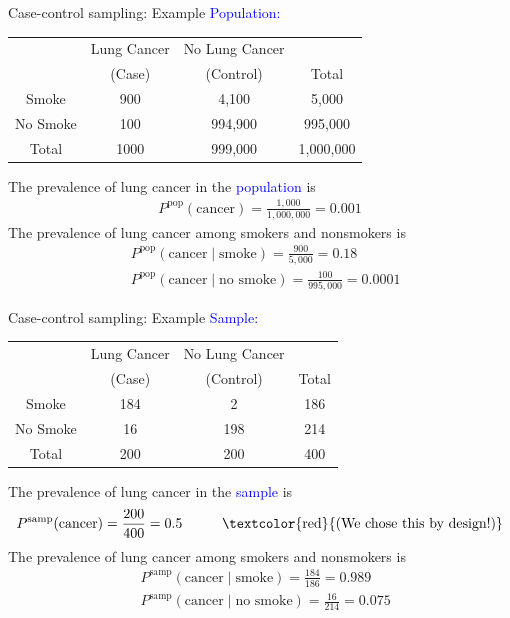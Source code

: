 \documentclass[10pt,t]{beamer}
\newcommand\tab[1][1cm]{\hspace*{#1}}
\begin{document}
\begin{frame}{Case-control sampling: Example}
	\vspace{-0.3cm}
	\textcolor{blue}{Population:}
	\begin{center}
	\begin{table}
		\begin{tabular}{|c|cc|c|}
			\hline 
			& Lung Cancer & No Lung Cancer &  \\ 
			& (Case) & (Control) & Total  \\
			\hline 
			Smoke & 900 & 4,100  & 5,000 \\ 
			No Smoke & 100 & 994,900 & 995,000  \\ 
			\hline 
			Total & 1000 & 999,000 & 1,000,000 \\ 
			\hline 
		\end{tabular}
	\end{table}
\end{center}\pause
The prevalence of lung cancer in the \textcolor{blue}{population} is
\begin{align*}
	P^{\text{pop}}(\text{cancer}) = \frac{1,000}{1,000,000} = 0.001
\end{align*}\pause
The prevalence of lung cancer among smokers and nonsmokers is
\begin{align*}
	&P^{\text{pop}}(\text{cancer} \mid \text{smoke}) = \frac{900}{5,000} = 0.18\\
	&P^{\text{pop}}(\text{cancer} \mid \text{no smoke}) = \frac{100}{995,000} = 0.0001
\end{align*}
\end{frame}

\begin{frame}{Case-control sampling: Example}
	\vspace{-0.3cm}
	\textcolor{blue}{Sample:}
		\begin{center}
	\begin{table}
		\begin{tabular}{|c|cc|c|}
			\hline 
			& Lung Cancer & No Lung Cancer &  \\ 
			& (Case) & (Control) & Total  \\
			\hline 
			Smoke & 184 & 2  & 186 \\ 
			No Smoke & 16 & 198 & 214  \\ 
			\hline 
			Total & 200 & 200 & 400 \\ 
			\hline 
		\end{tabular}
	\end{table}
\end{center}\pause
	The prevalence of lung cancer in the \textcolor{blue}{sample} is
	\begin{align*}
		P^{\text{samp}}(\text{cancer}) = \frac{200}{400} = 0.5 \tab \text{\textcolor{red}{(We chose this by design!)}}
	\end{align*}\pause
	The prevalence of lung cancer among smokers and nonsmokers is
	\begin{align*}
		&P^{\text{samp}}(\text{cancer} \mid \text{smoke}) = \frac{184}{186} = 0.989\\
		&P^{\text{samp}}(\text{cancer} \mid \text{no smoke}) = \frac{16}{214} = 0.075
	\end{align*}
\end{frame}
\end{document}
